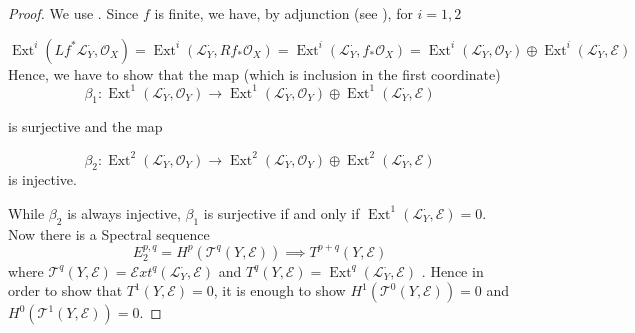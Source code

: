\documentclass[12pt,twoside,]{amsart}
\theoremstyle{plain}
\theoremstyle{definition}
\begin{document}
\begin{proof}
    We use \cite[Proposition $1.10$]{wehler86deformations}. Since $f$ is finite, we have, by adjunction (see \cite[Proposition $5.10$]{Hartresiduesandduality}), for $i = 1,2$ \par
    \noindent $\operatorname{Ext}^i(Lf^*\mathcal{L}_{Y}^{\cdot}, \mathcal{O}_X) = \operatorname{Ext}^i(\mathcal{L}_{Y}^{\cdot}, Rf_*\mathcal{O}_X) = \operatorname{Ext}^i(\mathcal{L}_{Y}^{\cdot}, f_*\mathcal{O}_X) = \operatorname{Ext}^i(\mathcal{L}_{Y}^{\cdot}, \mathcal{O}_Y) \oplus \operatorname{Ext}^i(\mathcal{L}_{Y}^{\cdot}, \mathcal{E})$
    Hence, we have to show that the map (which is inclusion in the first coordinate)
    $$\beta_1 : \operatorname{Ext}^1(\mathcal{L}_{Y}^{\cdot}, \mathcal{O}_Y) \to \operatorname{Ext}^1(\mathcal{L}_{Y}^{\cdot}, \mathcal{O}_Y) \oplus \operatorname{Ext}^1(\mathcal{L}_{Y}^{\cdot}, \mathcal{E})$$
    
    is surjective and the map 

    $$\beta_2 : \operatorname{Ext}^2(\mathcal{L}_{Y}^{\cdot}, \mathcal{O}_Y) \to \operatorname{Ext}^2(\mathcal{L}_{Y}^{\cdot}, \mathcal{O}_Y) \oplus \operatorname{Ext}^2(\mathcal{L}_{Y}^{\cdot}, \mathcal{E})$$
    is injective. \par

    While $\beta_2$ is always injective, $\beta_1$ is surjective if and only if 
    $\operatorname{Ext}^1(\mathcal{L}_{Y}^{\cdot}, \mathcal{E}) = 0$. Now there is a Spectral sequence
    $$E_2^{p,q} = H^p(\mathcal{T}^q(Y,\mathcal{E})) \implies T^{p+q}(Y,\mathcal{E})$$
    where $\mathcal{T}^q(Y,\mathcal{E}) = \mathcal{E}xt^q(\mathcal{L}_{Y}^{\cdot}, \mathcal{E})$ and $T^q(Y,\mathcal{E}) = \operatorname{Ext}^q(\mathcal{L}_{Y}^{\cdot}, \mathcal{E})$ .
    Hence in order to show that $T^1(Y, \mathcal{E}) = 0$, it is enough to show $H^1(\mathcal{T}^0(Y,\mathcal{E})) = 0$ and $H^0(\mathcal{T}^1(Y,\mathcal{E})) = 0$. 
    

\end{proof}
\end{document}
